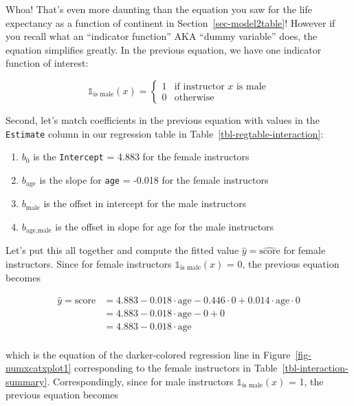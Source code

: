 \documentclass[
  letterpaper,
  DIV=11,
  numbers=noendperiod]{scrreprt}
\providecommand{\tightlist}{%
  \setlength{\itemsep}{0pt}\setlength{\parskip}{0pt}}\usepackage{longtable,booktabs,array}
\theoremstyle{definition}
\theoremstyle{remark}
\begin{document}
Whoa! That's even more daunting than the equation you saw for the life
expectancy as a function of continent in Section~\ref{sec-model2table}!
However if you recall what an ``indicator function'' AKA ``dummy
variable'' does, the equation simplifies greatly. In the previous
equation, we have one indicator function of interest:

\[
\mathbb{1}_{\mbox{is male}}(x) = \left\{
\begin{array}{ll}
1 & \text{if } \text{instructor } x \text{ is male} \\
0 & \text{otherwise}\end{array}
\right.
\]

Second, let's match coefficients in the previous equation with values in
the \texttt{Estimate} column in our regression table in
Table~\ref{tbl-regtable-interaction}:

\begin{enumerate}
\def\labelenumi{\arabic{enumi}.}
\tightlist
\item
  \(b_0\) is the \texttt{Intercept} = 4.883 for the female instructors
\item
  \(b_{\mbox{age}}\) is the slope for \texttt{age} = -0.018 for the
  female instructors
\item
  \(b_{\mbox{male}}\) is the offset in intercept for the male
  instructors
\item
  \(b_{\mbox{age,male}}\) is the offset in slope for age for the male
  instructors
\end{enumerate}

Let's put this all together and compute the fitted value
\(\widehat{y} = \widehat{\text{score}}\) for female instructors. Since
for female instructors \(\mathbb{1}_{\mbox{is male}}(x)\) = 0, the
previous equation becomes

\[
\begin{aligned}
\widehat{y} = \widehat{\text{score}} &= 4.883 - 0.018   \cdot \mbox{age} - 0.446 \cdot 0 + 0.014 \cdot \mbox{age} \cdot 0\\
&= 4.883 - 0.018    \cdot \mbox{age} - 0 + 0\\
&= 4.883 - 0.018    \cdot \mbox{age}\\
\end{aligned}
\]

which is the equation of the darker-colored regression line in
Figure~\ref{fig-numxcatxplot1} corresponding to the female instructors
in Table~\ref{tbl-interaction-summary}. Correspondingly, since for male
instructors \(\mathbb{1}_{\mbox{is male}}(x)\) = 1, the previous
equation becomes
\end{document}

